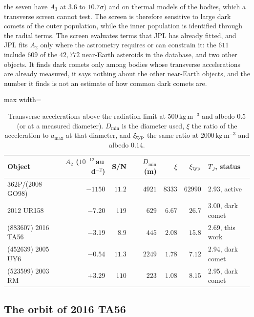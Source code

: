 \documentclass[3p,11pt]{elsarticle}
\begin{document}
the seven have $A_3$ at $3.6$ to $10.7\sigma$) and on thermal models of the bodies, which
a transverse screen cannot test. The screen is therefore sensitive to large dark comets
of the outer population, while the inner population is identified through the radial
terms. The screen evaluates terms that JPL has already fitted, and JPL fits $A_2$ only
where the astrometry requires or can constrain it: the $611$ include $609$ of the
$42{,}772$ near-Earth asteroids in the database, and two other objects. It finds dark
comets only among bodies whose transverse accelerations are already measured, it says
nothing about the other near-Earth objects, and the number it finds is not an estimate of
how common dark comets are.

\begin{table}[t]
\centering\small
\caption{Transverse accelerations above the radiation limit at $500$\,kg\,m$^{-3}$ and
albedo $0.5$ (or at a measured diameter). $D_{\min}$ is the diameter used, $\xi$ the ratio
of the acceleration to $a_{\max}$ at that diameter, and $\xi_{\rm typ}$ the same ratio at
$2000$\,kg\,m$^{-3}$ and albedo $0.14$.}
\label{tab:screen}
\begin{adjustbox}{max width=\textwidth}
\begin{tabular}{lrrrrrl}
\toprule
Object & $A_2$ ($10^{-12}$\,au\,d$^{-2}$) & S/N & $D_{\min}$ (m) & $\xi$ & $\xi_{\rm typ}$ & $T_J$, status \\
\midrule
362P/(2008 GO98) & $-1150$ & $11.2$ & $4921$ & $8333$ & $62990$ & 2.93, active \\
2012 UR158 & $-7.20$ & $119$ & $629$ & $6.67$ & $26.7$ & 3.00, dark comet \\
(883607) 2016 TA56 & $-3.19$ & $8.9$ & $445$ & $2.08$ & $15.8$ & 2.69, this work \\
(452639) 2005 UY6 & $-0.54$ & $11.3$ & $2249$ & $1.78$ & $7.12$ & 2.94, dark comet \\
(523599) 2003 RM & $+3.29$ & $110$ & $223$ & $1.08$ & $8.15$ & 2.95, dark comet \\
\bottomrule
\end{tabular}
\end{adjustbox}
\end{table}

\subsection{The orbit of 2016 TA56}
\end{document}

